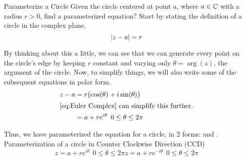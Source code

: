 \begin{example}{Parameterize a Circle}
  Given the circle centered at point $a$, where $a \in \operatorname{\mathbb{C}}$ with a radius $r > 0$, find a parameterized equation?
  \tcblower{}
  Start by stating the definition of a circle in the complex plane.
  \begin{equation*}
    \lvert z-a \rvert = r
  \end{equation*}

  By thinking about this a little, we can see that we can generate every point on the circle's edge by keeping $r$ constant and varying only $\theta = \arg(z)$, the argument of the circle.
  Now, to simplify things, we will also write some of the subsequent equations in polar form.
  \begin{align*}
    z - a &= r \bigl( \cos(\theta) + i \sin(\theta) \bigr) \\
    \shortintertext{\Cref{eq:Euler Complex} can simplify this further.}
          &= a + r e^{i \theta} \:\: 0 \leq \theta \leq 2\pi
  \end{align*}

  Thus, we have parameterized the equation for a circle, in 2 forms:  and .
Parameterization of a circle in Counter Clockwise Direction (CCD)
\begin{subequations}\label{eq:Circles_Parameterized}
  \begin{equation}\label{subeq:Circle_Parameterized_CCD}
    z = a + r e^{i \theta} \:\: 0 \leq \theta \leq 2\pi
  \end{equation}
  \begin{equation}\label{subeq:Circle_Parameterized_CD}
    z = a + r e^{-i \theta} \:\: 0 \leq \theta \leq 2\pi
  \end{equation}
\end{subequations}
\end{example}


